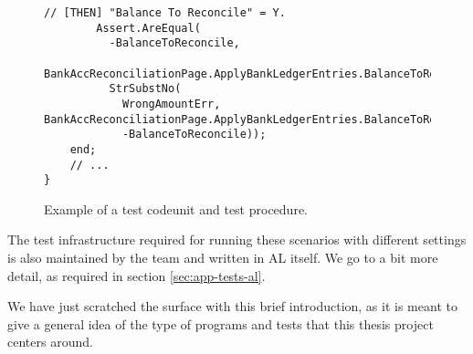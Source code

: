 \begin{figure}
\begin{Verbatim}[fontsize=\small]
        // [THEN] "Balance To Reconcile" = Y.
        Assert.AreEqual(
          -BalanceToReconcile,
          BankAccReconciliationPage.ApplyBankLedgerEntries.BalanceToReconcile.AsDEcimal,
          StrSubstNo(
            WrongAmountErr, BankAccReconciliationPage.ApplyBankLedgerEntries.BalanceToReconcile.Caption,
            -BalanceToReconcile));
    end;
    // ...
}
    \end{Verbatim}
    \caption{Example of a test codeunit and test procedure.}
    \label{f:app-al-test}
\end{figure}

The test infrastructure required for running these scenarios with different settings is also maintained
by the team and written in AL itself. We go to a bit more detail, as required in section \ref{sec:app-tests-al}.

We have just scratched the surface with this brief introduction, as it is meant to give a general idea of the
type of programs and tests that this thesis project centers around.